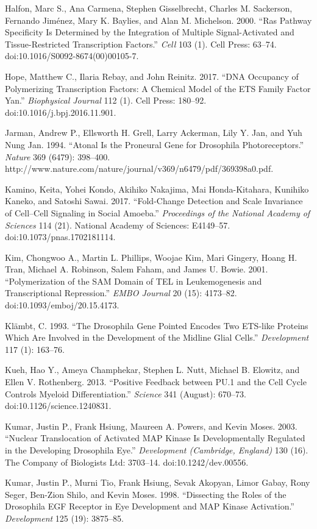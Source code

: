 Halfon, Marc S., Ana Carmena, Stephen Gisselbrecht, Charles M. Sackerson, Fernando Jiménez, Mary K. Baylies, and Alan M. Michelson. 2000. ``Ras Pathway Specificity Is Determined by the Integration of Multiple Signal-Activated and Tissue-Restricted Transcription Factors.'' \emph{Cell} 103 (1). Cell Press: 63--74. doi:10.1016/S0092-8674(00)00105-7.

Hope, Matthew C., Ilaria Rebay, and John Reinitz. 2017. ``DNA Occupancy of Polymerizing Transcription Factors: A Chemical Model of the ETS Family Factor Yan.'' \emph{Biophysical Journal} 112 (1). Cell Press: 180--92. doi:10.1016/j.bpj.2016.11.901.

Jarman, Andrew P., Ellsworth H. Grell, Larry Ackerman, Lily Y. Jan, and Yuh Nung Jan. 1994. ``Atonal Is the Proneural Gene for Drosophila Photoreceptors.'' \emph{Nature} 369 (6479): 398--400. http://www.nature.com/nature/journal/v369/n6479/pdf/369398a0.pdf.

Kamino, Keita, Yohei Kondo, Akihiko Nakajima, Mai Honda-Kitahara, Kunihiko Kaneko, and Satoshi Sawai. 2017. ``Fold-Change Detection and Scale Invariance of Cell--Cell Signaling in Social Amoeba.'' \emph{Proceedings of the National Academy of Sciences} 114 (21). National Academy of Sciences: E4149--57. doi:10.1073/pnas.1702181114.

Kim, Chongwoo A., Martin L. Phillips, Woojae Kim, Mari Gingery, Hoang H. Tran, Michael A. Robinson, Salem Faham, and James U. Bowie. 2001. ``Polymerization of the SAM Domain of TEL in Leukemogenesis and Transcriptional Repression.'' \emph{EMBO Journal} 20 (15): 4173--82. doi:10.1093/emboj/20.15.4173.

Klämbt, C. 1993. ``The Drosophila Gene Pointed Encodes Two ETS-like Proteins Which Are Involved in the Development of the Midline Glial Cells.'' \emph{Development} 117 (1): 163--76.

Kueh, Hao Y., Ameya Champhekar, Stephen L. Nutt, Michael B. Elowitz, and Ellen V. Rothenberg. 2013. ``Positive Feedback between PU.1 and the Cell Cycle Controls Myeloid Differentiation.'' \emph{Science} 341 (August): 670--73. doi:10.1126/science.1240831.

Kumar, Justin P., Frank Hsiung, Maureen A. Powers, and Kevin Moses. 2003. ``Nuclear Translocation of Activated MAP Kinase Is Developmentally Regulated in the Developing Drosophila Eye.'' \emph{Development (Cambridge, England)} 130 (16). The Company of Biologists Ltd: 3703--14. doi:10.1242/dev.00556.

Kumar, Justin P., Murni Tio, Frank Hsiung, Sevak Akopyan, Limor Gabay, Rony Seger, Ben-Zion Shilo, and Kevin Moses. 1998. ``Dissecting the Roles of the Drosophila EGF Receptor in Eye Development and MAP Kinase Activation.'' \emph{Development} 125 (19): 3875--85.

